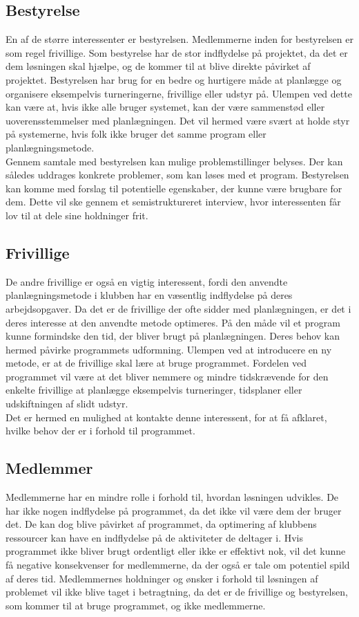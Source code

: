 \subsection*{Bestyrelse}
En af de større interessenter er bestyrelsen. Medlemmerne inden for bestyrelsen er som regel frivillige. Som bestyrelse har de stor indflydelse på projektet, da det er dem løsningen skal hjælpe, og de kommer til at blive direkte påvirket af projektet. Bestyrelsen har brug for en bedre og hurtigere måde at planlægge og organisere eksempelvis turneringerne, frivillige eller udstyr på. Ulempen ved dette kan være at, hvis ikke alle bruger systemet, kan der være sammenstød eller uoverensstemmelser med planlægningen. Det vil hermed være svært at holde styr på systemerne, hvis folk ikke bruger det samme program eller planlægningsmetode.\\ 
Gennem samtale med bestyrelsen kan mulige problemstillinger belyses. Der kan således uddrages konkrete problemer, som kan løses med et program. Bestyrelsen kan komme med forslag til potentielle egenskaber, der kunne være brugbare for dem. Dette vil ske gennem et semistruktureret interview, hvor interessenten får lov til at dele sine holdninger frit.

\subsection*{Frivillige}
De andre frivillige er også en vigtig interessent, fordi den anvendte planlægningsmetode i klubben har en væsentlig indflydelse på deres arbejdsopgaver. Da det er de frivillige der ofte sidder med planlægningen, er det i deres interesse at den anvendte metode optimeres. På den måde vil et program kunne formindske den tid, der bliver brugt på planlægningen. Deres behov kan hermed påvirke programmets udformning. Ulempen ved at introducere en ny metode, er at de frivillige skal lære at bruge programmet. Fordelen ved programmet vil være at det bliver nemmere og mindre tidskrævende for den enkelte frivillige at planlægge eksempelvis turneringer, tidsplaner eller udskiftningen af slidt udstyr.\\
Det er hermed en mulighed at kontakte denne interessent, for at få afklaret, hvilke behov der er i forhold til programmet.

\subsection*{Medlemmer}
Medlemmerne har en mindre rolle i forhold til, hvordan løsningen udvikles. De har ikke nogen indflydelse på programmet, da det ikke vil være dem der bruger det. De kan dog blive påvirket af programmet, da optimering af klubbens ressourcer kan have en indflydelse på de aktiviteter de deltager i. Hvis programmet ikke bliver brugt ordentligt eller ikke er effektivt nok, vil det kunne få negative konsekvenser for medlemmerne, da der også er tale om potentiel spild af deres tid. Medlemmernes holdninger og ønsker i forhold til løsningen af problemet vil ikke blive taget i betragtning, da det er de frivillige og bestyrelsen, som kommer til at bruge programmet, og ikke medlemmerne.

